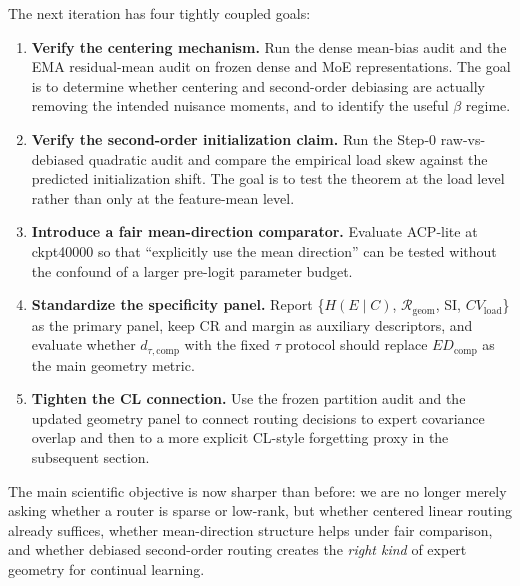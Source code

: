 \documentclass[11pt]{article}
\begin{document}
The next iteration has four tightly coupled goals:
\begin{enumerate}
    \item \textbf{Verify the centering mechanism.} Run the dense mean-bias audit and the EMA residual-mean audit on frozen dense and MoE representations. The goal is to determine whether centering and second-order debiasing are actually removing the intended nuisance moments, and to identify the useful $\beta$ regime.
    \item \textbf{Verify the second-order initialization claim.} Run the Step-0 raw-vs-debiased quadratic audit and compare the empirical load skew against the predicted initialization shift. The goal is to test the theorem at the load level rather than only at the feature-mean level.
    \item \textbf{Introduce a fair mean-direction comparator.} Evaluate ACP-lite at ckpt40000 so that ``explicitly use the mean direction'' can be tested without the confound of a larger pre-logit parameter budget.
    \item \textbf{Standardize the specificity panel.} Report \{$H(E\mid C)$, $\mathcal{R}_{\mathrm{geom}}$, SI, $CV_{\mathrm{load}}$\} as the primary panel, keep CR and margin as auxiliary descriptors, and evaluate whether $d_{\tau,\mathrm{comp}}$ with the fixed $\tau$ protocol should replace $ED_{\mathrm{comp}}$ as the main geometry metric.
    \item \textbf{Tighten the CL connection.} Use the frozen partition audit and the updated geometry panel to connect routing decisions to expert covariance overlap and then to a more explicit CL-style forgetting proxy in the subsequent section.
\end{enumerate}

The main scientific objective is now sharper than before: we are no longer merely asking whether a router is sparse or low-rank, but whether centered linear routing already suffices, whether mean-direction structure helps under fair comparison, and whether debiased second-order routing creates the \emph{right kind} of expert geometry for continual learning.
\end{document}
